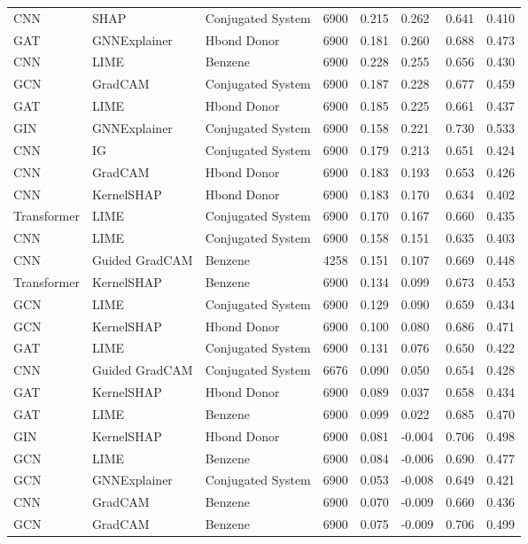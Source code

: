 \begin{table}
\begin{tabular}{lllrllll}
CNN & SHAP & Conjugated System & 6900 & 0.215 & 0.262 & 0.641 & 0.410 \\
GAT & GNNExplainer & Hbond Donor & 6900 & 0.181 & 0.260 & 0.688 & 0.473 \\
CNN & LIME & Benzene & 6900 & 0.228 & 0.255 & 0.656 & 0.430 \\
GCN & GradCAM & Conjugated System & 6900 & 0.187 & 0.228 & 0.677 & 0.459 \\
GAT & LIME & Hbond Donor & 6900 & 0.185 & 0.225 & 0.661 & 0.437 \\
GIN & GNNExplainer & Conjugated System & 6900 & 0.158 & 0.221 & 0.730 & 0.533 \\
CNN & IG & Conjugated System & 6900 & 0.179 & 0.213 & 0.651 & 0.424 \\
CNN & GradCAM & Hbond Donor & 6900 & 0.183 & 0.193 & 0.653 & 0.426 \\
CNN & KernelSHAP & Hbond Donor & 6900 & 0.183 & 0.170 & 0.634 & 0.402 \\
Transformer & LIME & Conjugated System & 6900 & 0.170 & 0.167 & 0.660 & 0.435 \\
CNN & LIME & Conjugated System & 6900 & 0.158 & 0.151 & 0.635 & 0.403 \\
CNN & Guided GradCAM & Benzene & 4258 & 0.151 & 0.107 & 0.669 & 0.448 \\
Transformer & KernelSHAP & Benzene & 6900 & 0.134 & 0.099 & 0.673 & 0.453 \\
GCN & LIME & Conjugated System & 6900 & 0.129 & 0.090 & 0.659 & 0.434 \\
GCN & KernelSHAP & Hbond Donor & 6900 & 0.100 & 0.080 & 0.686 & 0.471 \\
GAT & LIME & Conjugated System & 6900 & 0.131 & 0.076 & 0.650 & 0.422 \\
CNN & Guided GradCAM & Conjugated System & 6676 & 0.090 & 0.050 & 0.654 & 0.428 \\
GAT & KernelSHAP & Hbond Donor & 6900 & 0.089 & 0.037 & 0.658 & 0.434 \\
GAT & LIME & Benzene & 6900 & 0.099 & 0.022 & 0.685 & 0.470 \\
GIN & KernelSHAP & Hbond Donor & 6900 & 0.081 & -0.004 & 0.706 & 0.498 \\
GCN & LIME & Benzene & 6900 & 0.084 & -0.006 & 0.690 & 0.477 \\
GCN & GNNExplainer & Conjugated System & 6900 & 0.053 & -0.008 & 0.649 & 0.421 \\
CNN & GradCAM & Benzene & 6900 & 0.070 & -0.009 & 0.660 & 0.436 \\
GCN & GradCAM & Benzene & 6900 & 0.075 & -0.009 & 0.706 & 0.499 \\

\end{tabular}
\end{table}
